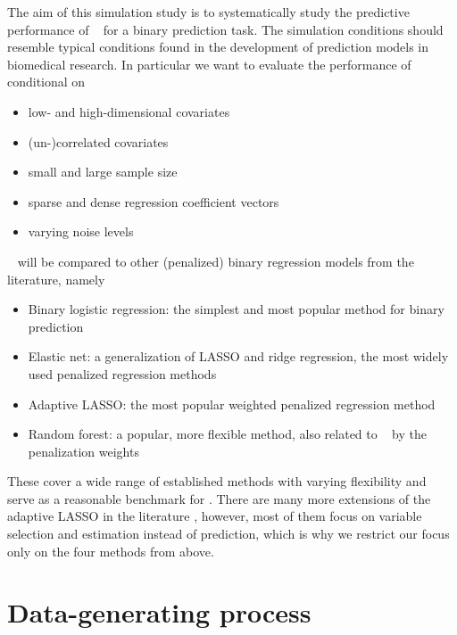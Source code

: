 \documentclass[a4paper, 11pt]{article}\usepackage[]{graphicx}\usepackage[]{color}
\begin{document}
The aim of this simulation study is to systematically study the predictive
performance of \ainet~ for a binary prediction task. The simulation conditions
should resemble typical conditions found in the development of prediction models
in biomedical research. In particular we want to evaluate the performance of
\ainet~ conditional on
\begin{itemize}
  \item low- and high-dimensional covariates
  \item (un-)correlated covariates
  \item small and large sample size
  \item sparse and dense regression coefficient vectors
  \item varying noise levels
\end{itemize}
\ainet~ will be compared to other (penalized) binary regression models
from the literature, namely
\begin{itemize}
  \item Binary logistic regression: the simplest and most popular method for
        binary prediction
  \item Elastic net: a generalization of LASSO and ridge regression, the most
        widely used penalized regression methods
  \item Adaptive LASSO: the most popular weighted penalized regression method
  \item Random forest: a popular, more flexible method, also related to \ainet~
        by the penalization weights
\end{itemize}
These cover a wide range of established methods with varying flexibility and
serve as a reasonable benchmark for \ainet. There are many more extensions of
the adaptive LASSO in the literature \citep[see \eg the review by][]{Vidaurre2013},
however, most of them focus on variable selection and
estimation instead of prediction, which is why we restrict our focus only on the
four methods from above.

\section{Data-generating process} \label{sec:dgp}
\end{document}

